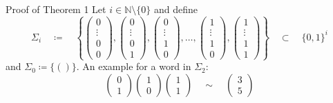 \documentclass[aspectratio=169]{beamer}
\begin{document}
	\begin{frame}{Proof of Theorem 1}
		Let $ i \in \mathbb{N} \setminus \{0\} $ and define
		\[
			\Sigma_{i} \quad\coloneqq\quad
			\left\{
				\begin{pmatrix}
					0\\
					\vdots\\
					0\\
					0
				\end{pmatrix},
				\begin{pmatrix}
					0\\
					\vdots\\
					0\\
					1
				\end{pmatrix},
				\begin{pmatrix}
					0\\
					\vdots\\
					1\\
					0
				\end{pmatrix}, \dots,
				\begin{pmatrix}
					1\\
					\vdots\\
					1\\
					0
				\end{pmatrix},
				\begin{pmatrix}
					1\\
					\vdots\\
					1\\
					1
				\end{pmatrix}
			\right\}
			\quad \subset\quad
			\{0, 1\}^{i}
		\]
		and $ \Sigma_{0} \coloneqq \{()\} $. An example for a word in $ \Sigma_{2} $:
		\[
			\begin{pmatrix}
				0\\
				1
			\end{pmatrix}
			\begin{pmatrix}
				1\\
				0
			\end{pmatrix}
			\begin{pmatrix}
				1\\
				1
			\end{pmatrix}
			\quad \sim \quad
			\begin{pmatrix}
				3\\
				5
			\end{pmatrix}
		\]
	\end{frame}
\end{document}

